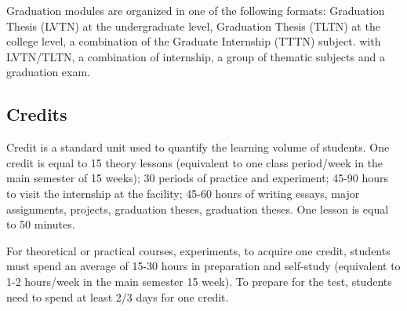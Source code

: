 Graduation modules are organized in one of the following formats: Graduation Thesis (LVTN) at the undergraduate level, Graduation Thesis (TLTN) at the college level, a combination of the Graduate Internship (TTTN) subject. with LVTN/TLTN, a combination of internship, a group of thematic subjects and a graduation exam.

\subsection{Credits}
Credit is a standard unit used to quantify the learning volume of students. One credit is equal to 15 theory lessons (equivalent to one class period/week in the main semester of 15 weeks); 30 periods of practice and experiment; 45-90 hours to visit the internship at the facility; 45-60 hours of writing essays, major assignments, projects, graduation theses, graduation theses. One lesson is equal to 50 minutes.

For theoretical or practical courses, experiments, to acquire one credit, students must spend an average of 15-30 hours in preparation and self-study (equivalent to 1-2 hours/week in the main semester 15 week). To prepare for the test, students need to spend at least 2/3 days for one credit.